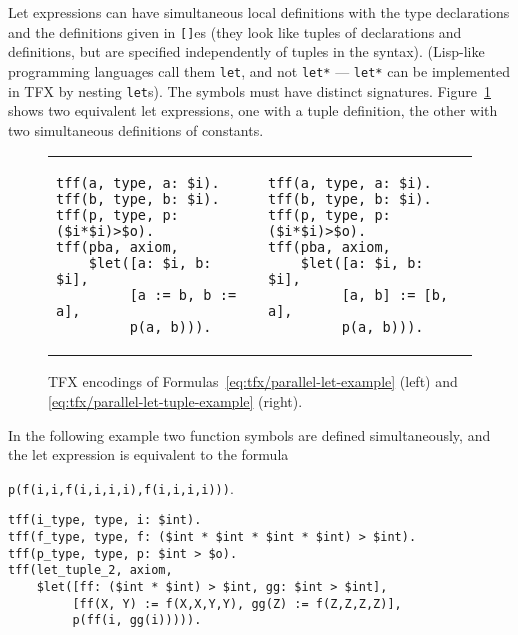 Let expressions can have simultaneous local definitions
with the type declarations and the definitions given in {\tt []}es
(they look like tuples of declarations and definitions, but are
specified independently of tuples in the syntax).
(Lisp-like programming languages call them \verb'let', and 
not \verb'let*' --- \verb'let*' can be implemented in TFX by nesting
\verb'let's).
The symbols must have distinct signatures.
Figure~\ref{fig:tfx/pba-tfx} shows two equivalent let expressions, one with a tuple definition, the other with two simultaneous definitions of constants.
\begin{figure}[htbp]
\hspace{-0.24cm}
\begin{tabular}[t]{ll}
\begin{minipage}{0.48\textwidth}
\begin{lstlisting}[language=tptp]
tff(a, type, a: $i).
tff(b, type, b: $i).
tff(p, type, p: ($i*$i)>$o).
tff(pba, axiom,
    $let([a: $i, b: $i],
         [a := b, b := a],
         p(a, b))).
\end{lstlisting}
\end{minipage}
    &
\begin{minipage}{0.48\textwidth}
\begin{lstlisting}[language=tptp]
tff(a, type, a: $i).
tff(b, type, b: $i).
tff(p, type, p: ($i*$i)>$o).
tff(pba, axiom,
    $let([a: $i, b: $i],
         [a, b] := [b, a],
         p(a, b))).
\end{lstlisting}
\end{minipage}
\end{tabular}
\caption{TFX encodings of Formulas~\ref{eq:tfx/parallel-let-example} (left) and \ref{eq:tfx/parallel-let-tuple-example} (right).}
\label{fig:tfx/pba-tfx}
\end{figure}

In the following example two function symbols are defined simultaneously, and the let expression is equivalent to the formula \begin{center}\lstinline[language=tptp,backgroundcolor=\color{lstgrey}]{p(f(i,i,f(i,i,i,i),f(i,i,i,i)))}.\end{center}
\begin{lstlisting}[language=tptp]
tff(i_type, type, i: $int).
tff(f_type, type, f: ($int * $int * $int * $int) > $int).
tff(p_type, type, p: $int > $o).
tff(let_tuple_2, axiom,
    $let([ff: ($int * $int) > $int, gg: $int > $int],
         [ff(X, Y) := f(X,X,Y,Y), gg(Z) := f(Z,Z,Z,Z)],
         p(ff(i, gg(i))))).
\end{lstlisting}

